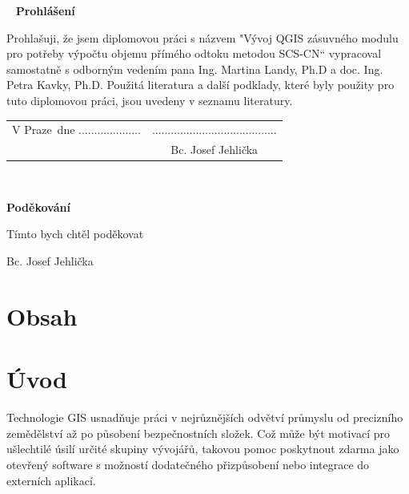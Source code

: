 \documentclass[a4paper,oneside,12pt]{book}
\newcommand{\tb}{\textbf} %
\newcommand{\autor}{Bc. Josef Jehlička}   %
\newcommand{\kde}{Praze} %
\newcommand{\prohlaseni}{Prohlašuji, že jsem diplomovou práci s názvem "Vývoj QGIS zásuvného modulu pro potřeby výpočtu objemu přímého odtoku metodou SCS-CN“ vypracoval samostatně s odborným vedením pana Ing. Martina Landy, Ph.D a doc. Ing. Petra Kavky, Ph.D. Použitá literatura a další podklady, které byly použity pro tuto diplomovou práci, jsou uvedeny v seznamu literatury. 
} %
\newcommand{\podekovani}{Tímto bych chtěl poděkovat } %
\begin{document}
\newpage %
\thispagestyle{empty}  %

~ %
\vfill %
\vspace{1em}
\tb{Prohlášení} %

\vspace{1em} %
\prohlaseni

\vspace{2em}  %
\hspace{-0.5em}\begin{tabularx}{\textwidth}{X c}  %
V \kde\ dne .................... &........................................ \\	%
	& \autor
\end{tabularx}	%







\newpage %
\thispagestyle{empty}  %

~
\vfill %


\vspace{1em}
\tb{Poděkování}

\vspace{1em} %
\podekovani
\begin{flushright}
\autor
\end{flushright}  %





\newpage
\chapter*{Obsah}




\newpage
\chapter*{Úvod} \label{uvod}
Technologie GIS usnadňuje práci v nejrůznějších odvětví průmyslu od precizního zemědělství až po působení bezpečnostních složek. Což může být motivací pro ušlechtilé úsilí určité skupiny vývojářů, takovou pomoc poskytnout zdarma jako otevřený software s možností dodatečného přizpůsobení nebo integrace do externích aplikací. 
\end{document}

